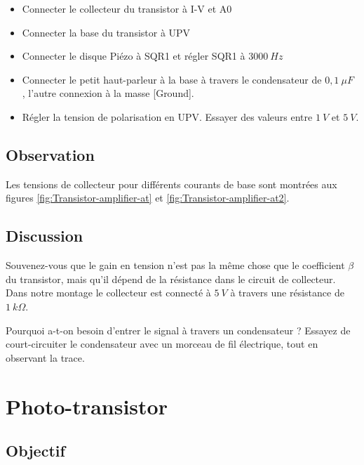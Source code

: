 \documentclass{book}
\begin{document}
\begin{itemize}
  \item Connecter le collecteur du transistor à I-V et A0
  \item Connecter la base du transistor à UPV
  \item Connecter le disque Piézo à SQR1 et régler SQR1 à $3000\ Hz$
  \item Connecter le petit haut-parleur à la base à travers le condensateur de $0,1\ \mu F$  , l'autre connexion à la masse [Ground].
  \item Régler la tension de polarisation en UPV. Essayer des valeurs entre $1\ V$ et $5\ V$.
\end{itemize}

\subsection{Observation}


Les tensions de collecteur pour différents courants de base sont montrées aux figures  \ref{fig:Transistor-amplifier-at} et  \ref{fig:Transistor-amplifier-at2}.

\subsection{Discussion}


Souvenez-vous que le gain en tension n'est pas la même chose que le coefficient $\beta$  du transistor, mais qu'il dépend de la résistance dans le circuit de collecteur. Dans notre montage le collecteur est connecté à $5\ V$ à travers une résistance de $1\ k\Omega$.



Pourquoi a-t-on besoin d'entrer le signal à travers un condensateur ? Essayez de court-circuiter le condensateur avec un morceau de fil électrique, tout en observant la trace.







\section{Photo-transistor}



\subsection{Objectif}
\end{document}
